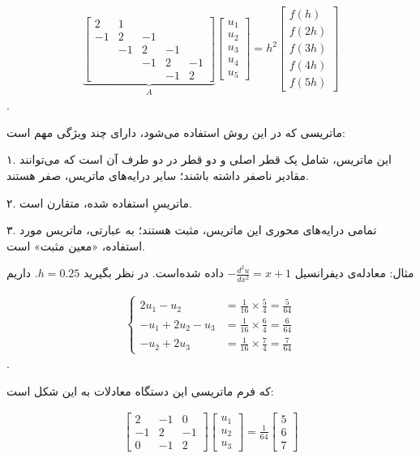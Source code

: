 \begin{align*}
\underbrace{\left[\begin{array}{ccccc}
	2 & 1 & & & \\
	-1 & 2 & -1 & & \\
	& -1 & 2 & -1 & \\
	& & -1 & 2 & -1 \\
	& & & -1 & 2
	\end{array}\right]}_{A}\left[\begin{array}{l}
u_{1} \\
u_{2} \\
u_{3} \\
u_{4} \\
u_{5}
\end{array}\right]=h^{2}\left[\begin{array}{l}
f(h) \\
f(2 h) \\
f(3 h) \\
f(4 h) \\
f(5 h)
\end{array}\right]
\end{align*}.

ماتریسی که در این روش استفاده می‌شود، دارای چند ویژگی مهم است:

۱. این ماتریس، شامل یک قطر اصلی و دو قطر در دو طرف آن است که می‌توانند مقادیر ناصفر داشته باشند؛ سایر درایه‌های ماتریس، صفر هستند.

۲. ماتریسِ استفاده شده، متقارن است.

۳. تمامی درایه‌های محوری این ماتریس، مثبت هستند؛ به عبارتی، ماتریس مورد استفاده، «معین مثبت» است.

مثال: معادله‌ی دیفرانسیل $-\frac{d^{2} u}{d x^{2}}=x+1$ داده شده‌است. در نظر بگیرید $h=0.25$. داریم

\begin{align*}
\left\{\begin{aligned}
2 u_{1}-u_{2} &=\frac{1}{16} \times \frac{5}{4}=\frac{5}{64} \\
-u_{1}+2 u_{2}-u_{3} &=\frac{1}{16} \times \frac{6}{4}=\frac{6}{64} \\
-u_{2}+2 u_{3} &=\frac{1}{16} \times \frac{7}{4}=\frac{7}{64}
\end{aligned}\right.
\end{align*}.

که فرم ماتریسی این دستگاه معادلات به این شکل است:

\begin{align*}
\left[\begin{array}{ccc}
2 & -1 & 0 \\
-1 & 2 & -1 \\
0 & -1 & 2
\end{array}\right]\left[\begin{array}{l}
u_{1} \\
u_{2} \\
u_{3}
\end{array}\right]=\frac{1}{64}\left[\begin{array}{l}
5 \\
6 \\
7
\end{array}\right]
\end{align*}

